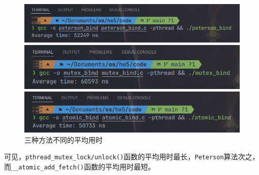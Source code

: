 \begin{solution}
\begin{parts}
\begin{figure}[H]
    \centering
    \begin{minipage}{0.6\textwidth}
        \centering
        \includegraphics[width=\textwidth]{img/peterson_bind.png}
    \end{minipage}
    \begin{minipage}{0.6\textwidth}
        \centering
        \vspace{1em}
        \includegraphics[width=\textwidth]{img/mutex_bind.png}
    \end{minipage}
    \begin{minipage}{0.6\textwidth}
        \centering
        \vspace{1em}
        \includegraphics[width=\textwidth]{img/atomic_bind.png}
    \end{minipage}
    \caption{三种方法不同的平均用时}
\end{figure}

可见，{\tt pthread\_mutex\_lock/unlock()}函数的平均用时最长，{\tt Peterson}算法次之， \\
而{\tt \_\_atomic\_add\_fetch()}函数的平均用时最短。

\end{parts}
\end{solution}

